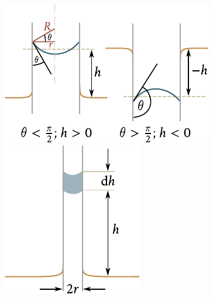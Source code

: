 \begin{figure}[!htb]
	\begin{minipage}[t]{0.5\linewidth}
		\begin{center}
			\includegraphics[scale=0.95]{figures/ch_14/fig_14_12.pdf}
			\caption[]{}
			\label{fig:14_12}
		\end{center}
	\end{minipage}
	\hspace{-0.05cm}
	\begin{minipage}[t]{0.5\linewidth}
		\begin{center}
			\includegraphics[scale=0.95]{figures/ch_14/fig_14_13.pdf}
			\caption[]{}
			\label{fig:14_13}
		\end{center}
	\end{minipage}
	\vspace{-0.4cm}
\end{figure}


